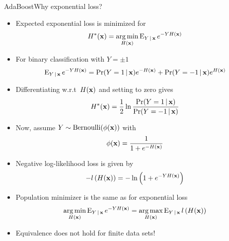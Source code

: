 \documentclass[handout]{beamer}
\begin{document}
\begin{frame}{AdaBoost}{Why exponential loss?}
\begin{itemize}[<+>]
	\item Expected exponential loss is minimized for
	\begin{gather*}
		H^*(\mathrm{\mathbf{x}}) = \operatorname*{arg\,min}_{H(\mathrm{\mathbf{x}})} \operatorname{E}_{Y\,|\, \mathrm{\mathbf{x}}} e^{-YH(\mathrm{\mathbf{x}})}
	\end{gather*}
	
	\item For binary classification with $ Y = \pm 1 $
	\begin{gather*}
		\operatorname{E}_{Y\,|\, \mathrm{\mathbf{x}}} e^{-YH(\mathrm{\mathbf{x}})} = \Pr(Y=1\,|\,\mathrm{\mathbf{x}}) e^{-H(\mathrm{\mathbf{x}})}
		+ \Pr(Y=-1\,|\,\mathrm{\mathbf{x}}) e^{H(\mathrm{\mathbf{x}})}
	\end{gather*}
	
	\item Differentiating w.r.t\ $ H(\mathrm{\mathbf{x}}) $ and setting to zero gives
	\begin{gather*}
		H^*(\mathrm{\mathbf{x}}) = \frac{1}{2} \ln \frac{\Pr(Y=1\,|\,\mathrm{\mathbf{x}})}{\Pr(Y=-1\,|\,\mathrm{\mathbf{x}})}
	\end{gather*}
	
\end{itemize}
\end{frame}

\begin{frame}
\begin{itemize}[<+>]
	\item Now, assume $ Y\sim\operatorname{Bernoulli}(\phi(\mathrm{\mathbf{x}})) $ with 
	\begin{gather*}
		\phi(\mathrm{\mathbf{x}}) = \frac{1}{1 + e^{-H(\mathrm{\mathbf{x}})}}
	\end{gather*}
	
	\item Negative log-likelihood loss is given by
	\begin{gather*}
		-l\left(H(\mathrm{\mathbf{x}})\right) = -\ln \left(1 + e^{-YH(\mathrm{\mathbf{x}})}\right)
	\end{gather*}
	
	\item Population minimizer is the same as for exponential loss
	\begin{gather*}
		\operatorname*{arg\,min}_{H(\mathrm{\mathbf{x}})} \operatorname{E}_{Y\,|\, \mathrm{\mathbf{x}}} e^{-YH(\mathrm{\mathbf{x}})}
		= \operatorname*{arg\,max}_{H(\mathrm{\mathbf{x}})} \operatorname{E}_{Y\,|\, \mathrm{\mathbf{x}}} l\left(H(\mathrm{\mathbf{x}})\right)
	\end{gather*}
	
	\item Equivalence does not hold for finite data sets!
\end{itemize}
\end{frame}
\end{document}
